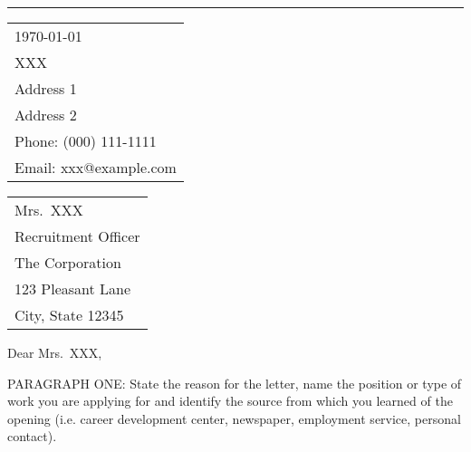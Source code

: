 \documentclass{article}
\begin{document}

\vspace{-1em} %

\rule{\linewidth}{1pt} %

\bigskip\bigskip %


\hfill
\begin{tabular}{l @{}}
	\today \bigskip\\ %
	XXX \\
	Address 1 \\ %
	Address 2 \\
	Phone: (000) 111-1111 \\
	Email: xxx@example.com
\end{tabular}

\bigskip %


\begin{tabular}{@{} l}
	Mrs.\ XXX \\
	Recruitment Officer \\
	The Corporation \\
	123 Pleasant Lane \\
	City, State 12345
\end{tabular}

\bigskip %

Dear Mrs.\ XXX,

\bigskip %


PARAGRAPH ONE: State the reason for the letter, name the position or type of work you are applying for and identify the source from which you learned of the opening (i.e. career development center, newspaper, employment service, personal contact).
\end{document}
